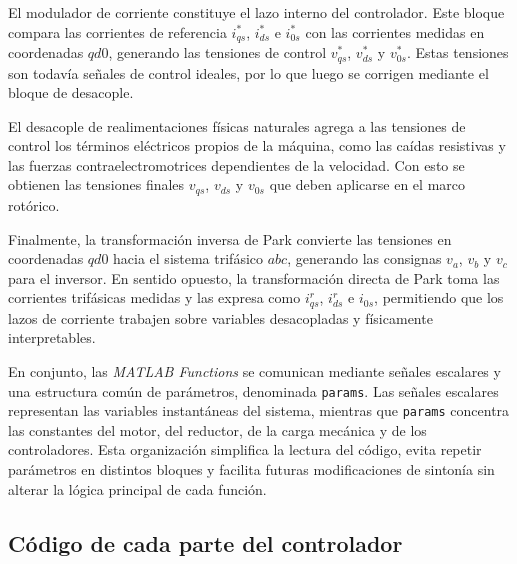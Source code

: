 \documentclass[12pt, a4paper,journal, onecolumn, compsoc]{IEEEtran}
\begin{document}
El modulador de corriente constituye el lazo interno del controlador. Este bloque compara las corrientes de referencia $i_{qs}^{*}$, $i_{ds}^{*}$ e $i_{0s}^{*}$ con las corrientes medidas en coordenadas $qd0$, generando las tensiones de control $v_{qs}^{*}$, $v_{ds}^{*}$ y $v_{0s}^{*}$. Estas tensiones son todavía señales de control ideales, por lo que luego se corrigen mediante el bloque de desacople.

El desacople de realimentaciones físicas naturales agrega a las tensiones de control los términos eléctricos propios de la máquina, como las caídas resistivas y las fuerzas contraelectromotrices dependientes de la velocidad. Con esto se obtienen las tensiones finales $v_{qs}$, $v_{ds}$ y $v_{0s}$ que deben aplicarse en el marco rotórico.

Finalmente, la transformación inversa de Park convierte las tensiones en coordenadas $qd0$ hacia el sistema trifásico $abc$, generando las consignas $v_a$, $v_b$ y $v_c$ para el inversor. En sentido opuesto, la transformación directa de Park toma las corrientes trifásicas medidas y las expresa como $i_{qs}^r$, $i_{ds}^r$ e $i_{0s}$, permitiendo que los lazos de corriente trabajen sobre variables desacopladas y físicamente interpretables.

En conjunto, las \textit{MATLAB Functions} se comunican mediante señales escalares y una estructura común de parámetros, denominada \texttt{params}. Las señales escalares representan las variables instantáneas del sistema, mientras que \texttt{params} concentra las constantes del motor, del reductor, de la carga mecánica y de los controladores. Esta organización simplifica la lectura del código, evita repetir parámetros en distintos bloques y facilita futuras modificaciones de sintonía sin alterar la lógica principal de cada función.
\subsection{Código de cada parte del controlador}
\end{document}
